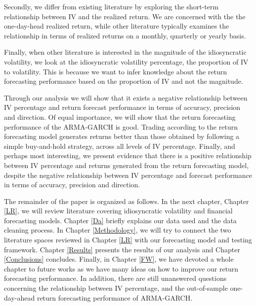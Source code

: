 Secondly, we differ from existing literature by exploring the short-term relationship between IV and the realized return. We are concerned with the the one-day-head realized return, while other literature typically examines the relationship in terms of realized returns on a monthly, quarterly or yearly basis.

Finally, when other literature is interested in the magnitude of the idiosyncratic volatility, we look at the idiosyncratic volatility percentage, the proportion of IV to volatility. This is because we want to infer knowledge about the return forecasting performance based on the proportion of IV and not the magnitude.

Through our analysis we will show that it exists a negative relationship between IV percentage and return forecast performance in terms of accuracy, precision and direction. Of equal importance, we will show that the return forecasting performance of the ARMA-GARCH is good. Trading according to the return forecasting model generates returns better than those obtained by following a simple buy-and-hold strategy, across all levels of IV percentage. Finally, and perhaps most interesting, we present evidence that there is a positive relationship between IV percentage and returns generated from the return forecasting model, despite the negative relationship between IV percentage and forecast performance in terms of accuracy, precision and direction. 

The remainder of the paper is organized as follows. In the next chapter, Chapter \ref{LR}, we will review literature covering idiosyncratic volatility and financial forecasting models. Chapter \ref{Da} briefly explains our data used and the data cleaning process. In Chapter \ref{Methodology}, we will try to connect the two literature spaces reviewed in Chapter \ref{LR} with our forecasting model and testing framework. Chapter \ref{Results} presents the results of our analysis and Chapter \ref{Conclusions} concludes. Finally, in Chapter \ref{FW}, we have devoted a whole chapter to future works as we have many ideas on how to improve our return forecasting performance. In addition, there are still unanswered questions concerning the relationship between IV percentage, and the out-of-sample one-day-ahead return forecasting performance of ARMA-GARCH.

